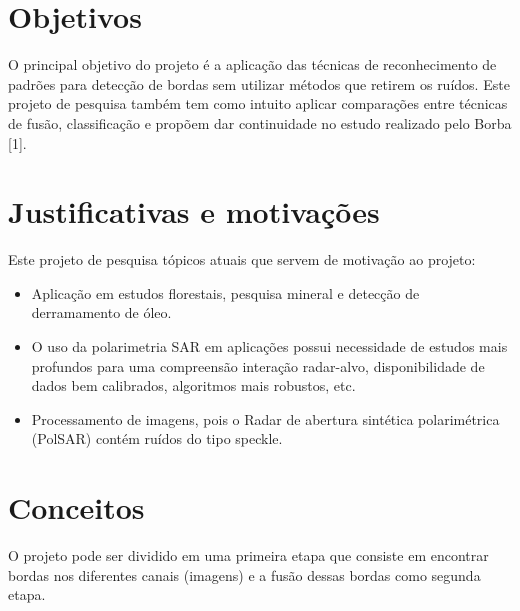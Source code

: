 \documentclass[runningheads]{llncs}
\begin{document}
\section{Objetivos}

O principal objetivo do projeto é a aplicação das técnicas de reconhecimento de padrões para detecção de bordas sem utilizar métodos que retirem os ruídos. Este projeto de pesquisa também tem como intuito aplicar comparações entre técnicas de fusão, classificação e propõem dar continuidade no estudo realizado pelo Borba [1].

\section{Justificativas e motivações}
Este projeto de pesquisa tópicos atuais que servem de motivação ao projeto:
\begin{itemize}
  \item Aplicação em estudos florestais, pesquisa mineral e detecção de derramamento de óleo.
  \item O uso da polarimetria SAR em aplicações possui necessidade de estudos mais profundos para uma compreensão interação radar-alvo, disponibilidade de dados bem calibrados, algoritmos mais robustos, etc.
  \item Processamento de imagens, pois o Radar de abertura sintética polarimétrica (PolSAR) contém ruídos do tipo speckle.
\end{itemize}


\section{Conceitos}
O projeto pode ser dividido em uma primeira etapa que consiste em encontrar bordas nos diferentes canais (imagens) e a fusão dessas bordas como segunda etapa.
\end{document}
